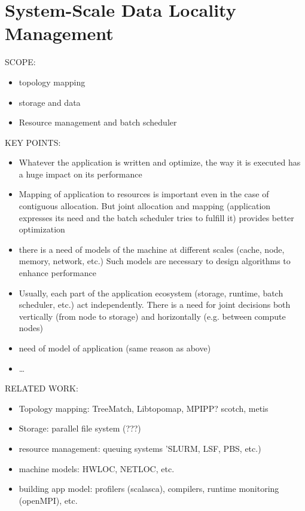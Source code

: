 \chapter{System-Scale Data Locality Management}
\label{ch:systemscale}







SCOPE:

\begin{itemize}
\item topology mapping
\item storage and data
\item Resource management and batch scheduler
\end{itemize}

KEY POINTS:
\begin{itemize}
\item Whatever the application is written and optimize, the way it is executed
  has a huge impact on its performance
 \item Mapping of application to resources is important even in the case of
   contiguous allocation. But joint allocation and mapping  (application
   expresses its need and the batch scheduler tries to fulfill it) provides
   better optimization
\item there is a need of models of the machine at different scales (cache, node,
memory, network, etc.) Such models are necessary to design algorithms to enhance
performance
  \item Usually, each part of the application ecosystem (storage, runtime, batch
    scheduler, etc.) act independently. There is a need for joint decisions both
    vertically (from node to storage) and horizontally (e.g. between compute
    nodes)
\item need of model of application (same reason as above)
\item \ldots
\end{itemize}

RELATED WORK: 

\begin{itemize}
\item Topology mapping: TreeMatch, Libtopomap, MPIPP? scotch, metis  
\item Storage: parallel file system (???)
\item resource management: queuing systems 'SLURM, LSF, PBS, etc.)
\item machine models: HWLOC, NETLOC, etc. 
\item building app model: profilers (scalasca), compilers, runtime monitoring (openMPI), etc. 
\end{itemize}

